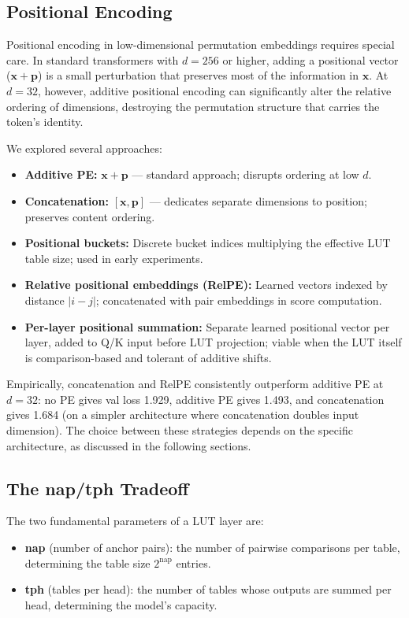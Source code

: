 \documentclass[11pt]{article}
\begin{document}
\subsection{Positional Encoding}
\label{sec:positional}

Positional encoding in low-dimensional permutation embeddings requires special care.
In standard transformers with $d = 256$ or higher, adding a positional vector ($\mathbf{x} + \mathbf{p}$) is a small perturbation that preserves most of the information in $\mathbf{x}$.
At $d = 32$, however, additive positional encoding can significantly alter the relative ordering of dimensions, destroying the permutation structure that carries the token's identity.

We explored several approaches:
\begin{itemize}
    \item \textbf{Additive PE:} $\mathbf{x} + \mathbf{p}$ --- standard approach; disrupts ordering at low $d$.
    \item \textbf{Concatenation:} $[\mathbf{x}, \mathbf{p}]$ --- dedicates separate dimensions to position; preserves content ordering.
    \item \textbf{Positional buckets:} Discrete bucket indices multiplying the effective LUT table size; used in early experiments.
    \item \textbf{Relative positional embeddings (RelPE):} Learned vectors indexed by distance $|i - j|$; concatenated with pair embeddings in score computation.
    \item \textbf{Per-layer positional summation:} Separate learned positional vector per layer, added to Q/K input before LUT projection; viable when the LUT itself is comparison-based and tolerant of additive shifts.
\end{itemize}

Empirically, concatenation and RelPE consistently outperform additive PE at $d = 32$: no PE gives val loss 1.929, additive PE gives 1.493, and concatenation gives 1.684 (on a simpler architecture where concatenation doubles input dimension).
The choice between these strategies depends on the specific architecture, as discussed in the following sections.

\subsection{The nap/tph Tradeoff}
\label{sec:nap_tph}

The two fundamental parameters of a LUT layer are:
\begin{itemize}
    \item \textbf{nap} (number of anchor pairs): the number of pairwise comparisons per table, determining the table size $2^{\mathrm{nap}}$ entries.
    \item \textbf{tph} (tables per head): the number of tables whose outputs are summed per head, determining the model's capacity.
\end{itemize}
\end{document}
